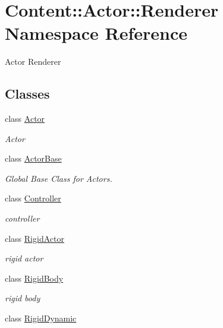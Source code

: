 \hypertarget{namespaceContent_1_1Actor_1_1Renderer}{
\section{Content::Actor::Renderer Namespace Reference}
\label{namespaceContent_1_1Actor_1_1Renderer}
}


Actor Renderer  
\subsection*{Classes}
\begin{DoxyCompactItemize}
\item 
class \hyperlink{classContent_1_1Actor_1_1Renderer_1_1Actor}{Actor}
\begin{DoxyCompactList}\small\item\em Actor \item\end{DoxyCompactList}\item 
class \hyperlink{classContent_1_1Actor_1_1Renderer_1_1ActorBase}{ActorBase}
\begin{DoxyCompactList}\small\item\em Global Base Class for Actors. \item\end{DoxyCompactList}\item 
class \hyperlink{classContent_1_1Actor_1_1Renderer_1_1Controller}{Controller}
\begin{DoxyCompactList}\small\item\em controller \item\end{DoxyCompactList}\item 
class \hyperlink{classContent_1_1Actor_1_1Renderer_1_1RigidActor}{RigidActor}
\begin{DoxyCompactList}\small\item\em rigid actor \item\end{DoxyCompactList}\item 
class \hyperlink{classContent_1_1Actor_1_1Renderer_1_1RigidBody}{RigidBody}
\begin{DoxyCompactList}\small\item\em rigid body \item\end{DoxyCompactList}\item 
class \hyperlink{classContent_1_1Actor_1_1Renderer_1_1RigidDynamic}{RigidDynamic}

\end{DoxyCompactItemize}
